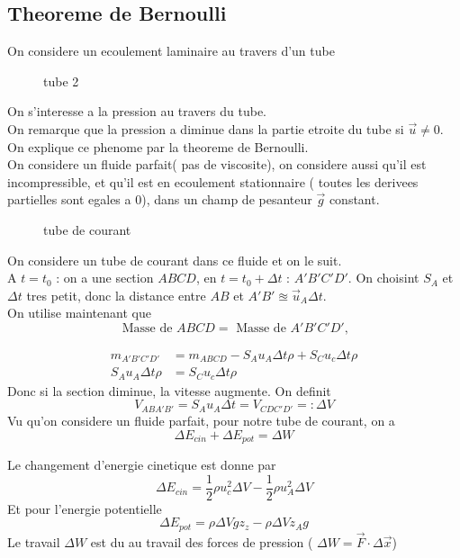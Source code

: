 \documentclass[../main.tex]{subfiles}
\begin{document}
\subsection{Theoreme de Bernoulli}
On considere un ecoulement laminaire au travers d'un tube
\begin{figure}[H]
    \centering
    \caption{tube 2}
\end{figure}
On s'interesse a la pression au travers du tube.\\
On remarque que la pression a diminue dans la partie etroite du tube si $\vec{u} \neq 0$.\\
On explique ce phenome par la theoreme de Bernoulli.\\
On considere un fluide parfait( pas de viscosite), on considere aussi qu'il est incompressible, et qu'il est en ecoulement stationnaire ( toutes les derivees partielles sont egales a 0), dans un champ de pesanteur $\vec{g}$ constant.

\begin{figure}[H]
    \centering
    \caption{tube de courant}
\end{figure}
On considere un tube de courant dans ce fluide et on le suit.\\
A $t= t_0$ : on a une section $ABCD$, en $t= t_0+ \Delta t$ : $A'B'C'D'$. 
On choisint $S_A$ et $\Delta t$ tres petit, donc la distance entre $AB$ et $A'B' \approxeq \vec{u}_A \Delta t$.\\
On utilise maintenant que
\[ 
\text{ Masse de } ABCD = \text{ Masse de  } A'B'C'D', \]

\begin{align*}
	m_{A'B'C'D'} &=m_{ABCD} - S_A u_A \Delta t  \rho + S_C u_c \Delta t \rho\\
S_A u_A \Delta t \rho &= S_C u_c \Delta t \rho
\end{align*}
Donc si la section diminue, la vitesse augmente.
On definit
\[ 
V_{ABA'B'} = S_A u_A \Delta t = V_{CDC'D'} =: \Delta V
\]
Vu qu'on considere un fluide parfait, pour notre tube de courant, on a 
\[ 
\Delta E_{cin}  + \Delta E_{pot}  = \Delta W
\]

Le changement d'energie cinetique est donne par
\[ 
	\Delta E_{cin}  = \frac{1}{2}\rho u_c ^{2} \Delta V - \frac{1}{2}\rho u_A^{2}\Delta V
\]
Et pour l'energie potentielle
\[ 
	\Delta E_{pot}  = \rho \Delta V g z_z - \rho \Delta V z_A g
\]
Le travail $\Delta W$ est du au travail des forces de pression ( $\Delta W = \vec{F} \cdot \Delta \vec{x}$) 
\end{document}
